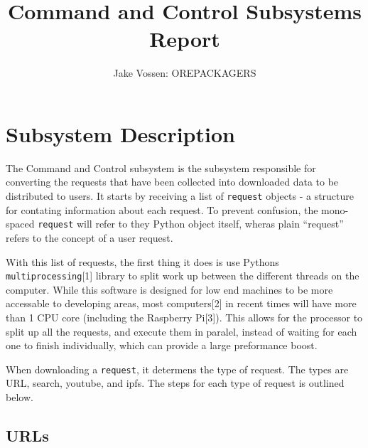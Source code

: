 \documentclass{article}
\begin{document}
\title{Command and Control Subsystems Report}
\author{Jake Vossen: OREPACKAGERS}

\maketitle


\section{Subsystem Description}
The Command and Control subsystem is the subsystem responsible for
converting the requests that have been collected into downloaded data
to be distributed to users. It starts by receiving a list of
\texttt{request} objects - a structure for contating information about
each request. To prevent confusion, the mono-spaced \texttt{request}
will refer to they Python object itself, wheras plain ``request''
refers to the concept of a user request.

With this list of requests, the first thing it does is use Pythons
\texttt{multiprocessing}[1] library to split work up between the
different threads on the computer. While this software is designed
for low end machines to be more accessable to developing areas, most
computers[2] in recent times will have more than 1 CPU core (including
the Raspberry Pi[3]). This allows for the processor to split up all
the requests, and execute them in paralel, instead of waiting for each
one to finish individually, which can provide a large preformance
boost.

When downloading a \texttt{request}, it determens the type of
request. The types are URL, search, youtube, and ipfs. The steps for
each type of request is outlined below. 

\subsection{URLs}
\end{document}
